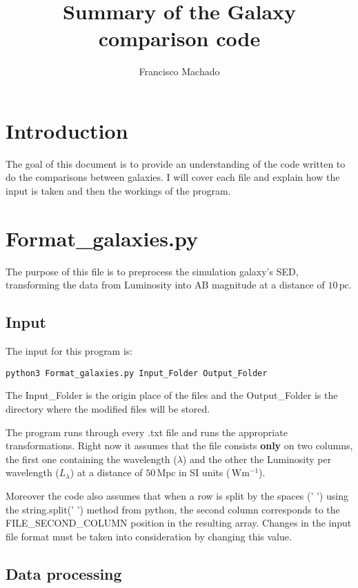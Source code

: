 \documentclass[11pt]{report}
\author{Francisco Machado}
\title{Summary of the Galaxy comparison code}
\newcommand{\unit}[1]{\ensuremath{\, \mathrm{#1}}}
\begin{document}
\maketitle

\section{Introduction}

The goal of this document is to provide an understanding of the code written to do the comparisons between galaxies.
I will cover each file and explain how the input is taken and then the workings of the program.

\section{Format\_galaxies.py}

The purpose of this file is to preprocess the simulation galaxy's SED, transforming the data from Luminosity into AB magnitude at a distance of $10 \unit{pc}$.

\subsection{Input}

The input for this program is:
\begin{verbatim}
python3 Format_galaxies.py Input_Folder Output_Folder
\end{verbatim}

The Input\_Folder is the origin place of the files and the Output\_Folder is the directory where the modified files will be stored.

The program runs through every .txt file and runs the appropriate transformations. Right now it assumes that the file consists {\bf only} on two columns, the first one containing the wavelength ($\lambda$) and the other the Luminosity per wavelength ($L_\lambda$) at a distance of $50 \unit{Mpc}$ in SI units ($\unit{W m^{-1}}$).


Moreover the code also assumes that when a row is split by the spaces (' ') using the string.split(' ') method from python, the second column corresponds to the FILE\_SECOND\_COLUMN position in the resulting array. Changes in the input file format must be taken into consideration by changing this value.

\subsection{Data processing}
\end{document}
